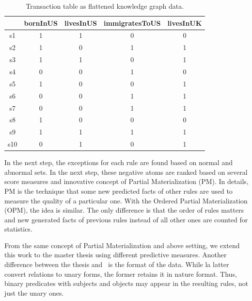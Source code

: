 \begin{table}
\begin{center}
\begin{tabular}{|c|c|c|c|c|}
\hline
 & bornInUS & livesInUS & immigratesToUS & livesInUK\\
\hline\hline
s1 & 1 & 1 & 0 & 0\\
\hline
s2 & 1 & 0 & 1 & 1\\
\hline
s3 & 1 & 1 & 0 & 1\\
\hline
s4 & 0 & 0 & 1 & 0\\
\hline
s5 & 1 & 0 & 0 & 1\\
\hline
s6 & 0 & 0 & 1 & 1\\
\hline
s7 & 0 & 0 & 1 & 1\\
\hline
s8 & 1 & 0 & 0 & 0\\
\hline
s9 & 1 & 1 & 1 & 1\\
\hline
s10 & 0 & 1 & 0 & 1\\
\hline
\end{tabular}
\end{center}
\caption{Transaction table as flattened knowledge graph data.}
\label{table2}
\end{table}

In the next step, the exceptions for each rule are found based on normal and abnormal sets. In the next step, these negative atoms are ranked based on several score measures and innovative concept of Partial Materialization (PM). In details, PM is the technique that some new predicted facts of other rules are used to measure the quality of a particular one. With the Ordered Partial Materialization (OPM), the idea is similar. The only difference is that the order of rules matters and new generated facts of previous rules instead of all other ones are counted for statistics.

From the same concept of Partial Materialization and above setting, we extend this work to the master thesis using different predictive measures. Another difference between the thesis and~\cite{ref12} is the format of the data. While la latter convert relations to unary forms, the former retains it in nature format. Thus, binary predicates with subjects and objects may appear in the resulting rules, not just the unary ones.

